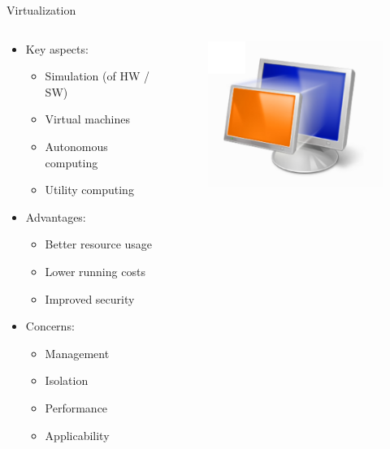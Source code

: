 \begin{frame}{Virtualization}
	\begin{columns}[T]
		\begin{column}{.6\textwidth}
			\begin{itemize}
			\item Key aspects:
				\begin{itemize}
				\item Simulation (of HW / SW)
				\item Virtual machines
				\item Autonomous computing
				\item Utility computing
				\end{itemize}
			\item Advantages:
				\begin{itemize}
				\item Better resource usage
				\item Lower running costs
				\item Improved security
				\end{itemize}
			\item Concerns:
				\begin{itemize}
				\item Management
				\item Isolation
				\item Performance
				\item Applicability
				\end{itemize}
			\end{itemize}	
		\end{column}
		\begin{column}{.4\textwidth}
			\begin{figure}[hb]
				\centering
				\includegraphics[width=\textwidth]{img/virt.png}
			\end{figure}
		\end{column}
	\end{columns}
\end{frame}

